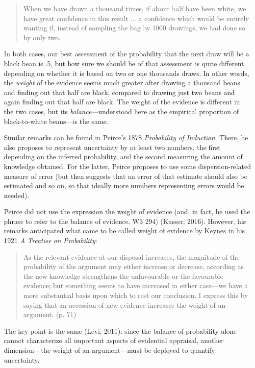 \documentclass[
  10pt,
  dvipsnames,enabledeprecatedfontcommands]{scrartcl}
\begin{document}
\begin{quote} When we have drawn a thousand times, if about half have been white, we have great confidence in this result ... a confidence which would be entirely wanting if, instead of sampling the bag by 1000 drawings, we had done so by only two.
\end{quote}

\noindent In both cases, our best assessment of the probability that the
next draw will be a black bean is .5, but how sure we should be of that
assessment is quite different depending on whether it is based on two or
one thousands draws. In other words, the \emph{weight} of the evidence
seems much greater after drawing a thousand beans and finding out that
half are black, compared to drawing just two beans and again finding out
that half are black. The weight of the evidence is different in the two
cases, but its \emph{balance}---understood here as the empirical
proportion of black-to-white beans---is the same.

Similar remarks can be found in Peirce's 1878
\emph{Probability of Induction}. There, he also proposes to represent
uncertainty by at least two numbers, the first depending on the inferred
probability, and the second measuring the amount of knowledge obtained.
For the latter, Peirce proposes to use some dispersion-related measure
of error (but then suggests that an error of that estimate should also
be estimated and so on, so that ideally more numbers representing errors
would be needed).

Peirce did not use the expression the weight of evidence (and, in fact,
he used the phrase to refer to the balance of evidence, W3 294) (Kasser,
2016). However, his remarks anticipated what came to be called weight of
evidence by Keynes in his 1921 \emph{A Treatise on Probability}:

\begin{quote}
As the relevant evidence at our disposal increases, the magnitude of the
probability of the argument may either increase or decrease, according as the new knowledge strengthens the unfavourable or the favourable evidence; but something seems to have increased in either case---we have a more substantial basis upon which to rest our conclusion. I express this by saying that an accession of new evidence increases the weight of an argument. (p. 71)
\end{quote}

\noindent The key point is the same (Levi, 2011): since the balance of
probability alone cannot characterize all important aspects of
evidential appraisal, another dimension---the weight of an
argument---must be deployed to quantify uncertainty.
\end{document}
